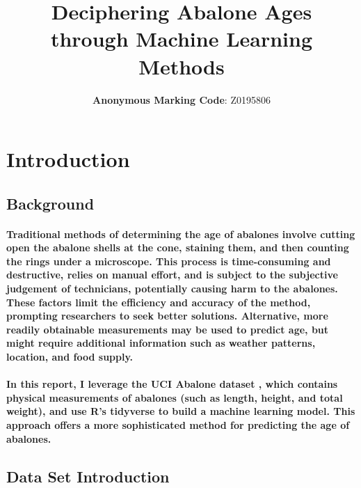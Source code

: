 \documentclass[11pt]{article} %
\title{Deciphering Abalone Ages \\ through Machine Learning Methods}
\author{\textbf{Anonymous Marking Code}: Z0195806}
\begin{document}
\maketitle
% 
% 
% 
\tableofcontents
% 
% 
\section{Introduction}
\subsection{Background}
\paragraph{Traditional methods of determining the age of abalones involve cutting open the abalone shells at the cone, staining them, and then counting the rings under a microscope. This process is time-consuming and destructive, relies on manual effort, and is subject to the subjective judgement of technicians, potentially causing harm to the abalones. These factors limit the efficiency and accuracy of the method, prompting researchers to seek better solutions. Alternative, more readily obtainable measurements may be used to predict age, but might require additional information such as weather patterns, location, and food supply.}
% 
\paragraph{In this report, I leverage the UCI Abalone dataset \cite{misc_abalone_1}, which contains physical measurements of abalones (such as length, height, and total weight), and use R's tidyverse to build a machine learning model. This approach offers a more sophisticated method for predicting the age of abalones.}
% 
% 
\subsection{Data Set Introduction}
% 
\end{document}
